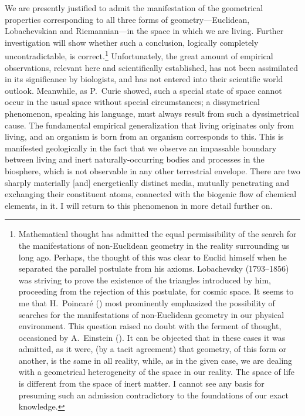 We are presently justified to admit the manifestation of the geometrical
properties corresponding to all three forms of geometry---Euclidean,
Lobachevskian and Riemannian---in the space in which we are living.  Further
investigation will show whether such a conclusion, logically completely
uncontradictable, is correct.\footnote{
	Mathematical thought has admitted the equal permissibility of the
	search for the manifestations of non-Euclidean geometry in the reality
	surrounding us long ago.  Perhaps, the thought of this was clear to
	Euclid himself when he separated the parallel postulate from his
	axioms.  Lobachevsky (1793--1856) was striving to prove the existence
	of the triangles introduced by him, proceeding from the rejection of
	this postulate, for cosmic space.  It seems to me that H.~Poincaré
	(\cite[3, 66]{poincare1902science}) most prominently emphasized the
	possibility of searches for the manifestations of non-Euclidean
	geometry in our physical environment.  This question raised no doubt
	with the ferment of thought, occasioned by
	A.~Einstein (\cite{einstein1921geometrie}).  It can be objected that in
	these cases it was admitted, as it were,  (by a
	tacit agreement) that geometry, of this form or another, is the same in
	all reality, while, as in the given case, we are dealing with a
	geometrical heterogeneity of the space in our reality.  The space of
	life is different from the space of inert matter.  I cannot see any
	basis for presuming such an admission contradictory to the foundations
	of our exact knowledge.
}  Unfortunately, the great amount of empirical observations, relevant here and
scientifically established, has not been assimilated in its significance by
biologists, and has not entered into their scientific world outlook.
Meanwhile, as P.~Curie showed, such a special state of space cannot occur in
the usual space without special circumstances; a dissymetrical phenomenon,
speaking his language, must always result from such a dyssimetrical cause.  The
fundamental empirical generalization that living originates only from living,
and an organism is born from an organism corresponds to this.  This is
manifested geologically in the fact that we observe an impassable boundary
between living and inert naturally-occurring bodies and processes in the
biosphere, which is not observable in any other terrestrial envelope.  There
are two sharply materially [and] energetically distinct media, mutually
penetrating and exchanging their constituent atoms, connected with the biogenic
flow of chemical elements, in it.  I will return to this phenomenon in more
detail further on.


